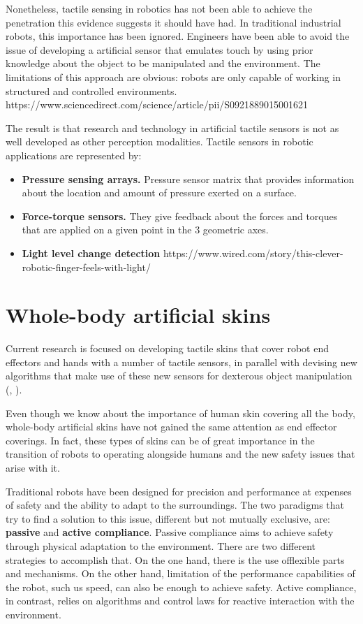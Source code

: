 Nonetheless, tactile sensing in robotics has not been able to achieve the penetration this evidence suggests it should have had. In traditional industrial robots, this importance has been ignored. Engineers have been able to avoid the issue of developing a artificial sensor that emulates touch by using prior knowledge about the object to be manipulated and the environment. The limitations of this approach are obvious: robots are only capable of working in structured and controlled environments. https://www.sciencedirect.com/science/article/pii/S0921889015001621

The result is that research and technology in artificial tactile sensors is not as well developed as other perception modalities. Tactile sensors in robotic applications are represented by:

\begin{itemize}
    \item\textbf{Pressure sensing arrays.} Pressure sensor matrix that provides information about the location and amount of pressure exerted on a surface.
    \item\textbf{Force-torque sensors.} They give feedback about the forces and torques that are applied on a given point in the 3 geometric axes.
    \item\textbf{Light level change detection}  https://www.wired.com/story/this-clever-robotic-finger-feels-with-light/
\end{itemize}

\section{Whole-body artificial skins}
Current research is focused on developing tactile skins that cover robot end effectors and hands with a number of tactile sensors, in parallel with devising new algorithms that make use of these new sensors for dexterous object manipulation (\cite{tianFeel}, \cite{wilson2020design}).

Even though we know about the importance of human skin covering all the body, whole-body artificial skins have not gained the same attention as end effector coverings. In fact, these types of skins can be of great importance in the transition of robots to operating alongside humans and the new safety issues that arise with it.

Traditional robots have been designed for precision and performance at expenses of safety and the ability to adapt to the surroundings. The two paradigms that try to find a solution to this issue, different but not mutually exclusive, are: \textbf{passive} and \textbf{active compliance}.  Passive compliance aims to achieve safety through physical adaptation to the environment. There are two different strategies to accomplish that. On the one hand, there is the use offlexible parts and mechanisms. On the other hand, limitation of the performance capabilities of the robot, such us speed, can also be enough to achieve safety. Active compliance, in contrast, relies on algorithms and control laws for reactive interaction with the environment.

